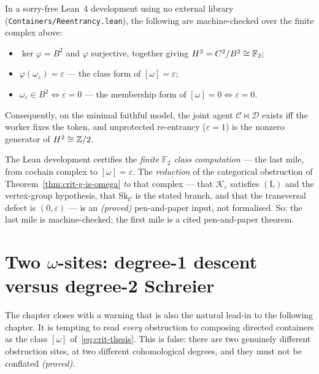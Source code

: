 \begin{theorem}[${[\omega]=\varepsilon}$; \emph{(lean-verified)}]
\label{thm:crit-lean}
In a sorry-free Lean~4 development using no external library
(\texttt{Containers/Reentrancy.lean}), the following are machine-checked over the
finite complex above:
\begin{itemize}
\item $\ker\varphi=B^2$ and $\varphi$ surjective, together giving
  $H^2=C^2/B^2\cong\mathbb{F}_2$;
\item $\varphi(\omega_\varepsilon)=\varepsilon$ --- the class form of
  $[\omega]=\varepsilon$;
\item $\omega_\varepsilon\in B^2\iff\varepsilon=0$ --- the membership form of
  $[\omega]=0\iff\varepsilon=0$.
\end{itemize}
Consequently, on the minimal faithful model, the joint agent
$\mathcal{C}\bowtie\mathcal{D}$ exists iff the worker fixes the token, and
unprotected re-entrancy ($\varepsilon=1$) is the nonzero generator of
$H^2\cong\mathbb{Z}/2$.
\end{theorem}

\begin{remark}
\label{rem:crit-boundary}
The Lean development certifies the \emph{finite $\mathbb{F}_2$ class computation}
--- the last mile, from cochain complex to $[\omega]=\varepsilon$. The
\emph{reduction} of the categorical obstruction of
Theorem~\ref{thm:crit-g-is-omega} \emph{to} that complex --- that
$\mathcal{K}_\varepsilon$ satisfies $(\mathrm{L})$ and the vertex-group
hypothesis, that $\mathrm{Sk}_{\mathcal{C}}$ is the stated branch, and that
the transversal defect is $(0,\varepsilon)$ --- is an \emph{(proved)}
pen-and-paper input, not formalised. So: the last mile is machine-checked; the
first mile is a cited pen-and-paper theorem.
\end{remark}

\section{Two $\omega$-sites: degree-1 descent versus degree-2 Schreier}
\label{sec:crit-two-sites}

The chapter closes with a warning that is also the natural lead-in to the
following chapter. It is tempting to read \emph{every} obstruction to composing
directed containers as the class $[\omega]$ of~\eqref{eq:crit-thesis}. This is
false: there are two genuinely different obstruction sites, at two different
cohomological degrees, and they must not be conflated \emph{(proved)}.

